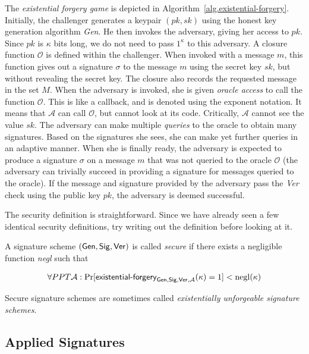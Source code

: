 The \emph{existential forgery game} is depicted in Algorithm~\ref{alg.existential-forgery}.
Initially, the challenger generates a keypair $(pk, sk)$ using the honest key generation
algorithm \emph{Gen}. He then invokes the adversary, giving her access to $pk$. Since
$pk$ is $\kappa$ bits long, we do not need to pass $1^\kappa$ to this adversary.
A closure function $\mathcal{O}$ is defined within the challenger. When invoked
with a message $m$, this function gives out a signature $\sigma$ to the message
$m$ using the secret key $sk$, but without revealing the secret key. The closure
also records the requested message in the set $M$.
When the adversary is invoked, she is given \emph{oracle access} to call the
function $\mathcal{O}$. This is like a callback, and is denoted using the
exponent notation. It means that $\mathcal{A}$ can call $\mathcal{O}$, but
cannot look at its code. Critically, $\mathcal{A}$ cannot see the value $sk$.
The adversary can make multiple \emph{queries} to the oracle to obtain many
signatures. Based on the signatures she sees, she can make yet further queries
in an adaptive manner. When she is finally ready, the adversary is expected
to produce a signature $\sigma$ on a message $m$ that was not queried to the
oracle $\mathcal{O}$ (the adversary can trivially succeed in providing a signature
for messages queried to the oracle). If the message and signature provided by
the adversary pass the \emph{Ver} check using the public key $pk$, the adversary
is deemed successful.

The security definition is straightforward. Since we have already seen a few
identical security definitions, try writing out the definition before looking
at it.

\begin{definition}
  A signature scheme $(\mathsf{Gen}, \mathsf{Sig}, \mathsf{Ver})$ is called \emph{secure} if there
  exists a negligible function \emph{negl} such that

  \begin{align*}
    \forall PPT \mathcal{A}:
    \Pr[\textsf{existential-forgery}_{\mathsf{Gen}, \mathsf{Sig}, \mathsf{Ver}, \mathcal{A}}(\kappa) = 1] < \mathrm{negl}(\kappa)
  \end{align*}
\end{definition}

Secure signature schemes are sometimes called \emph{existentially unforgeable signature
schemes}.

\subsection*{Applied Signatures}

